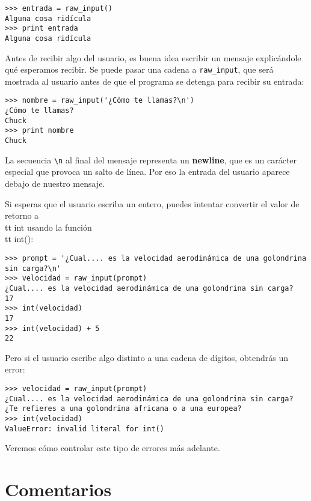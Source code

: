 \beforeverb
\begin{verbatim}
>>> entrada = raw_input()
Alguna cosa ridícula
>>> print entrada
Alguna cosa ridícula
\end{verbatim}
\afterverb
%
Antes de recibir algo del usuario, es buena idea escribir
un mensaje explicándole qué esperamos recibir. Se puede pasar una cadena a
\verb"raw_input", que será mostrada al usuario antes de que el programa se detenga
para recibir su entrada:


\beforeverb
\begin{verbatim}
>>> nombre = raw_input('¿Cómo te llamas?\n')
¿Cómo te llamas?
Chuck
>>> print nombre
Chuck
\end{verbatim}
\afterverb
%
La secuencia \verb"\n" al final del mensaje representa un {\bf newline},
que es un carácter especial que provoca un salto de línea.
Por eso la entrada del usuario aparece debajo de nuestro mensaje.


Si esperas que el usuario escriba un entero, puedes intentar convertir
el valor de retorno a {\\tt int} usando la función {\\tt int()}:

\beforeverb
\begin{verbatim}
>>> prompt = '¿Cual.... es la velocidad aerodinámica de una golondrina sin carga?\n'
>>> velocidad = raw_input(prompt)
¿Cual.... es la velocidad aerodinámica de una golondrina sin carga?
17
>>> int(velocidad)
17
>>> int(velocidad) + 5
22
\end{verbatim}
\afterverb
%
Pero si el usuario escribe algo distinto a una cadena de dígitos,
obtendrás un error:

\beforeverb
\begin{verbatim}
>>> velocidad = raw_input(prompt)
¿Cual.... es la velocidad aerodinámica de una golondrina sin carga?
¿Te refieres a una golondrina africana o a una europea?
>>> int(velocidad)
ValueError: invalid literal for int()
\end{verbatim}
\afterverb
%
Veremos cómo controlar este tipo de errores más adelante.



\section{Comentarios}

